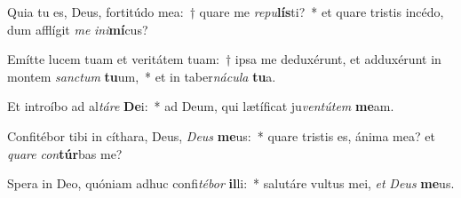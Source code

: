\item Quia tu es, Deus, fortitúdo mea:~† quare me \textit{re}\textit{pu}\textbf{lís}ti?~* et quare tristis incédo, dum afflígit \textit{me} \textit{in}\textit{i}\textbf{mí}cus?
\item Emítte lucem tuam et veritátem tuam:~† ipsa me deduxérunt, et adduxérunt in montem \textit{sanc}\textit{tum} \textbf{tu}um,~* et in taber\textit{ná}\textit{cu}\textit{la} \textbf{tu}a.
\item Et introíbo ad al\textit{tá}\textit{re} \textbf{De}i:~* ad Deum, qui lætíficat ju\textit{ven}\textit{tú}\textit{tem} \textbf{me}am.
\item Confitébor tibi in cíthara, Deus, \textit{De}\textit{us} \textbf{me}us:~* quare tristis es, ánima mea? et \textit{qua}\textit{re} \textit{con}\textbf{túr}bas me?
\item Spera in Deo, quóniam adhuc confi\textit{té}\textit{bor} \textbf{il}li:~* salutáre vultus mei, \textit{et} \textit{De}\textit{us} \textbf{me}us.
